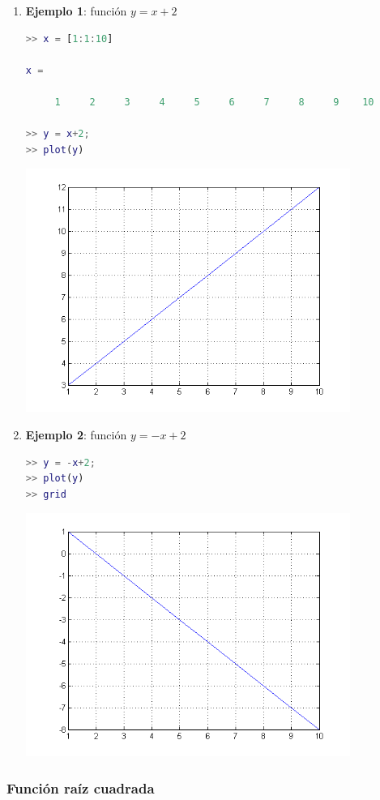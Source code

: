\begin{enumerate}

\item \textbf{Ejemplo 1}: función $y = x + 2$
\begin{lstlisting}[language=Matlab]
>> x = [1:1:10]

x =

     1     2     3     4     5     6     7     8     9    10

>> y = x+2;
>> plot(y)
\end{lstlisting}
\includegraphics[width=300pt]{./Imagenes/ejem1.png}

\item \textbf{Ejemplo 2}: función $y = -x + 2$
\begin{lstlisting}[language=Matlab]
>> y = -x+2;
>> plot(y)
>> grid
\end{lstlisting}
\includegraphics[width=300pt]{./Imagenes/ejem2.png}
\end{enumerate}

\subsubsection{Función raíz cuadrada}

